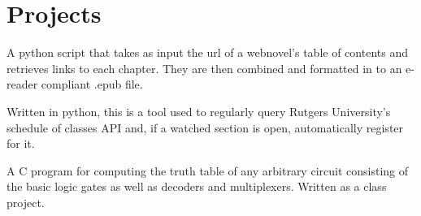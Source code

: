 \documentclass[letterpaper]{deedy-resume} %
\begin{document}
	\begin{minipage}[t]{0.66\textwidth} %
		
		
		\section{Projects}
		
		
		\vspace{\topsep} %
		\begin{tightitemize}
			\item A python script that takes as input the url of a webnovel's table of contents and retrieves links to each chapter. They are then combined and formatted in to an e-reader compliant .epub file.
		\end{tightitemize}
		
		
		\sectionspace %
		
		
		\vspace{\topsep} %
		\begin{tightitemize}
			\item Written in python, this is a tool used to regularly query Rutgers University's schedule of classes API and, if a watched  section is open, automatically register for it.
		\end{tightitemize}
		
		
		\sectionspace %
		
		
		\vspace{\topsep} %
		\begin{tightitemize}
			\item A C program for computing the truth table of any arbitrary circuit consisting of the basic logic gates as well as decoders and multiplexers. Written as a class project.
		\end{tightitemize}
		
		
		\sectionspace %
		

\end{minipage}
\end{document}
